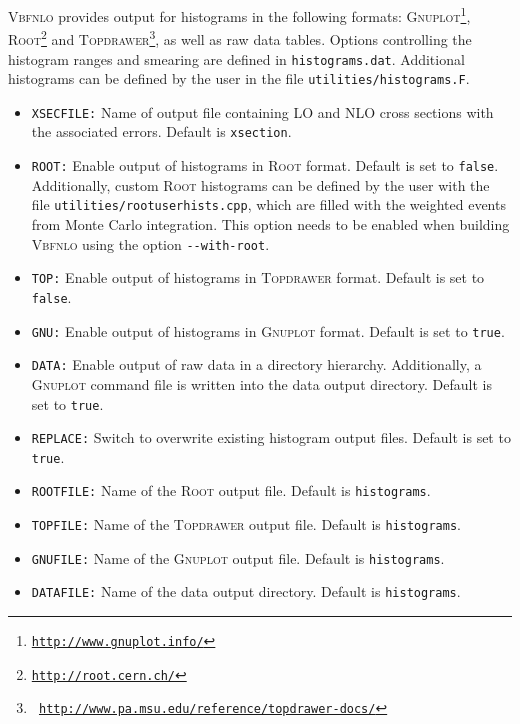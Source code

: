 \documentclass[english,12pt]{article}
\begin{document}
\textsc{Vbfnlo} provides output for histograms in the following formats:
\textsc{Gnuplot}\footnote{\tt \href{http://www.gnuplot.info/}{http://www.gnuplot.info/}},
\textsc{Root}\footnote{\tt \href{http://root.cern.ch/}{http://root.cern.ch/}} and \textsc{Topdrawer}\footnote{\tt
\href{http://www.pa.msu.edu/reference/topdrawer-docs/}{http://www.pa.msu.edu/reference/topdrawer-docs/}}, 
as well as raw data tables.  Options controlling the histogram ranges and smearing are defined in
{\tt histograms.dat}. Additional histograms can be defined by the user in the
file {\tt utilities/histograms.F}.
\begin{itemize}
\item {\tt XSECFILE:} Name of output file containing LO and NLO cross sections
with the associated errors.  Default is {\tt xsection}.
\item {\tt ROOT:} Enable output of histograms in \textsc{Root} format. Default
is set to {\tt false}. Additionally, custom \textsc{Root}
histograms can be defined by the user with the file {\tt utilities/rootuserhists.cpp}, which are filled with the
weighted events from Monte Carlo integration.  This option needs to be enabled
when building \textsc{Vbfnlo} using the option {\tt -{}-with-root}.
\item {\tt TOP:} Enable output of histograms  in 
  \textsc{Topdrawer} format. Default is set to {\tt false}.
\item {\tt GNU:} Enable output of histograms in \textsc{Gnuplot}
  format. Default is set to {\tt true}.
\item {\tt DATA:} Enable output of raw data in a directory hierarchy. Additionally, a \textsc{Gnuplot}
                  command file is written into the data output directory.
  Default is set to {\tt true}.
\item {\tt REPLACE:} Switch to overwrite existing histogram output files. 
Default is set to {\tt true}. 
\item {\tt ROOTFILE:} Name of the \textsc{Root} output file. Default is 
{\tt histograms}.
\item {\tt TOPFILE:}  Name of the \textsc{Topdrawer} output file. Default is 
{\tt histograms}.
\item {\tt GNUFILE:}  Name of the \textsc{Gnuplot} output file. Default is 
{\tt histograms}.
\item {\tt DATAFILE:}  Name of the data output directory. Default is 
{\tt histograms}.
\end{itemize}
\end{document}

